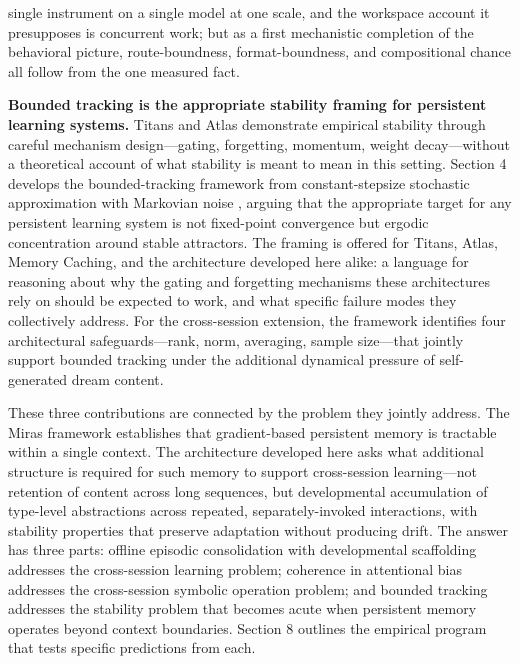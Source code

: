 \documentclass[11pt]{article}
\begin{document}
single instrument on a single model at one scale, and the workspace account it presupposes is concurrent work; but as a first mechanistic completion of the behavioral picture, route-boundness, format-boundness, and compositional chance all follow from the one measured fact.

\textbf{Bounded tracking is the appropriate stability framing for persistent learning systems.} Titans and Atlas demonstrate empirical stability through careful mechanism design---gating, forgetting, momentum, weight decay---without a theoretical account of what stability is meant to mean in this setting. Section 4 develops the bounded-tracking framework from constant-stepsize stochastic approximation with Markovian noise \cite{borkar2008, mou2020}, arguing that the appropriate target for any persistent learning system is not fixed-point convergence but ergodic concentration around stable attractors. The framing is offered for Titans, Atlas, Memory Caching, and the architecture developed here alike: a language for reasoning about why the gating and forgetting mechanisms these architectures rely on should be expected to work, and what specific failure modes they collectively address. For the cross-session extension, the framework identifies four architectural safeguards---rank, norm, averaging, sample size---that jointly support bounded tracking under the additional dynamical pressure of self-generated dream content.

These three contributions are connected by the problem they jointly address. The Miras framework establishes that gradient-based persistent memory is tractable within a single context. The architecture developed here asks what additional structure is required for such memory to support cross-session learning---not retention of content across long sequences, but developmental accumulation of type-level abstractions across repeated, separately-invoked interactions, with stability properties that preserve adaptation without producing drift. The answer has three parts: offline episodic consolidation with developmental scaffolding addresses the cross-session learning problem; coherence in attentional bias addresses the cross-session symbolic operation problem; and bounded tracking addresses the stability problem that becomes acute when persistent memory operates beyond context boundaries. Section 8 outlines the empirical program that tests specific predictions from each.
\end{document}

